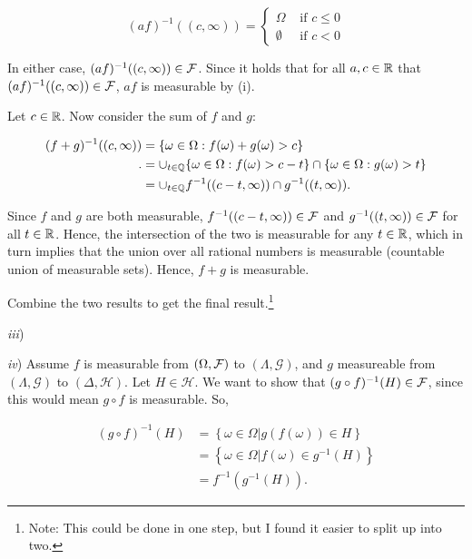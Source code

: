 \documentclass[]{book}
\let\rmarkdownfootnote\footnote%
\def\footnote{\protect\rmarkdownfootnote}
\theoremstyle{definition}
\theoremstyle{definition}
\theoremstyle{definition}
\theoremstyle{remark}
\begin{document}
\[(af)^{-1}((c,\infty)) = 
  \left\{ 
    \begin{matrix} 
      \Omega & \text{ if } c \le 0 \\ 
      \emptyset & \text{ if } c < 0 
    \end{matrix}
  \right .
\]

In either case, \((af)^{-1}((c, \infty)) \in \mathcal{F}\). Since it holds that
for all \(a,c \in \mathbb{R}\) that \((af)^{-1}((c,\infty)) \in \mathcal{F}\), \(af\) is
measurable by (i).

Let \(c \in \mathbb{R}\). Now consider the sum of \(f\) and \(g\):

\[\begin{aligned}
  (f + g)^{-1}((c, \infty)) &= \left\{ \omega \in \Omega : f(\omega) + g(\omega) > c \right\} \\.
                            &= \cup_{t \in \mathbb{Q}} \{\omega \in \Omega : f(\omega) > c - t \} \cap \{\omega \in \Omega : g(\omega) > t \} \\
                            &= \cup_{t \in \mathbb{Q}} f^{-1}((c-t, \infty)) \cap g^{-1}((t, \infty)).
\end{aligned}\]

Since \(f\) and \(g\) are both measurable,
\(f^{-1}((c-t, \infty)) \in \mathcal{F}\) and \(g^{-1}((t, \infty))\in \mathcal{F}\) for
all \(t \in \mathbb{R}\). Hence, the intersection of the two is measurable for
any \(t \in \mathbb{R}\), which in turn implies that the union over all rational
numbers is measurable (countable union of measurable sets). Hence,
\(f+g\) is measurable.

Combine the two results to get the final result.\footnote{Note: This
  could be done in one step, but I found it easier to split up into two.}

\emph{iii})

\emph{iv}) Assume \(f\) is measurable from \((\Omega, \mathcal{F})\) to
\((\Lambda, \mathcal{G})\), and \(g\) measureable from
\((\Lambda, \mathcal{G})\) to \((\Delta, \mathcal{H})\). Let
\(H \in \mathcal{H}\). We want to show that
\((g \circ f)^{-1}(H) \in \mathcal{F}\), since this would mean \(g \circ f\) is
measurable. So,

\[\begin{aligned}
  (g \circ f)^{-1}(H) &= \left\{ \omega \in \Omega | g(f(\omega)) \in H \right\} \\ 
                      &= \left\{ \omega \in \Omega | f(\omega) \in g^{-1}(H) \right\} \\ 
                      &= f^{-1}(g^{-1}(H)).
\end{aligned}\]
\end{document}
